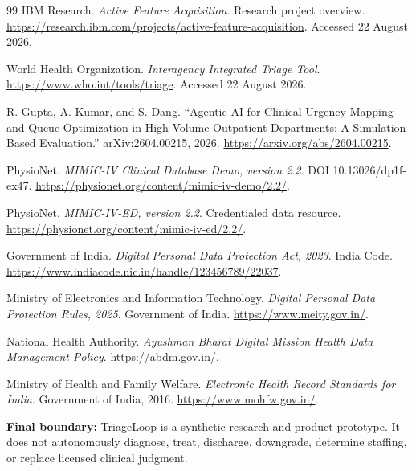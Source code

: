 \documentclass[11pt,a4paper]{article}
\begin{document}
\begin{thebibliography}{99}
IBM Research. \emph{Active Feature Acquisition}. Research project overview. \url{https://research.ibm.com/projects/active-feature-acquisition}. Accessed 22 August 2026.

World Health Organization. \emph{Interagency Integrated Triage Tool}. \url{https://www.who.int/tools/triage}. Accessed 22 August 2026.

R. Gupta, A. Kumar, and S. Dang. ``Agentic AI for Clinical Urgency Mapping and Queue Optimization in High-Volume Outpatient Departments: A Simulation-Based Evaluation.'' arXiv:2604.00215, 2026. \url{https://arxiv.org/abs/2604.00215}.

PhysioNet. \emph{MIMIC-IV Clinical Database Demo, version 2.2}. DOI 10.13026/dp1f-ex47. \url{https://physionet.org/content/mimic-iv-demo/2.2/}.

PhysioNet. \emph{MIMIC-IV-ED, version 2.2}. Credentialed data resource. \url{https://physionet.org/content/mimic-iv-ed/2.2/}.

Government of India. \emph{Digital Personal Data Protection Act, 2023}. India Code. \url{https://www.indiacode.nic.in/handle/123456789/22037}.

Ministry of Electronics and Information Technology. \emph{Digital Personal Data Protection Rules, 2025}. Government of India. \url{https://www.meity.gov.in/}.

National Health Authority. \emph{Ayushman Bharat Digital Mission Health Data Management Policy}. \url{https://abdm.gov.in/}.

Ministry of Health and Family Welfare. \emph{Electronic Health Record Standards for India}. Government of India, 2016. \url{https://www.mohfw.gov.in/}.

\end{thebibliography}

\normalsize
\vspace{5mm}
\begin{center}
\colorbox{TBrandSoft}{\parbox{0.92\textwidth}{\centering\vspace{2mm}\textbf{Final boundary:} TriageLoop is a synthetic research and product prototype. It does not autonomously diagnose, treat, discharge, downgrade, determine staffing, or replace licensed clinical judgment.\vspace{2mm}}}
\end{center}
\end{document}
